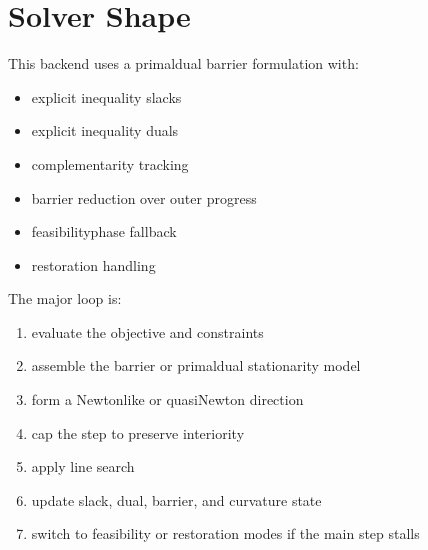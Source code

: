 \documentclass[letterpaper,10pt,english]{sphinxmanual}
\begin{document}
\section{Solver Shape}
\label{\detokenize{optima_internal_protocol:solver-shape}}
\sphinxAtStartPar
This backend uses a primal\sphinxhyphen{}dual barrier formulation with:
\begin{itemize}
\item {} 
\sphinxAtStartPar
explicit inequality slacks

\item {} 
\sphinxAtStartPar
explicit inequality duals

\item {} 
\sphinxAtStartPar
complementarity tracking

\item {} 
\sphinxAtStartPar
barrier reduction over outer progress

\item {} 
\sphinxAtStartPar
feasibility\sphinxhyphen{}phase fallback

\item {} 
\sphinxAtStartPar
restoration handling

\end{itemize}

\sphinxAtStartPar
The major loop is:
\begin{enumerate}
%
\item {} 
\sphinxAtStartPar
evaluate the objective and constraints

\item {} 
\sphinxAtStartPar
assemble the barrier or primal\sphinxhyphen{}dual stationarity model

\item {} 
\sphinxAtStartPar
form a Newton\sphinxhyphen{}like or quasi\sphinxhyphen{}Newton direction

\item {} 
\sphinxAtStartPar
cap the step to preserve interiority

\item {} 
\sphinxAtStartPar
apply line search

\item {} 
\sphinxAtStartPar
update slack, dual, barrier, and curvature state

\item {} 
\sphinxAtStartPar
switch to feasibility or restoration modes if the main step stalls

\end{enumerate}
\end{document}
